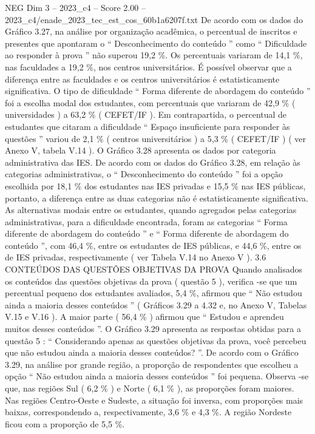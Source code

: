 \begin{textsample}{NEG Dim 3 – 2023\_c4 – Score 2.00 – 2023\_c4/enade\_2023\_tec\_est\_cos\_60b1a6207f.txt}
De acordo com os dados do Gráfico 3.27, na análise por organização acadêmica, o percentual de inscritos e presentes que apontaram o “ Desconhecimento do conteúdo ” como “ Dificuldade ao responder à prova ” não superou 19,2 \%.
Os percentuais variaram de 14,1 \%, nas faculdades a 19,2 \%, nos centros universitários.
É possível observar que a diferença entre as faculdades e os centros universitários é estatisticamente significativa.
O tipo de dificuldade “ Forma diferente de abordagem do conteúdo ” foi a escolha modal dos estudantes, com percentuais que variaram de 42,9 \% ( universidades ) a 63,2 \% ( CEFET/IF ).
Em contrapartida, o percentual de estudantes que citaram a dificuldade “ Espaço insuficiente para responder às questões ” variou de 2,1 \% ( centros universitários ) a 5,3 \% ( CEFET/IF ) ( ver Anexo V, tabela V.14 ).
O Gráfico 3.28 apresenta os dados por categoria administrativa das IES.
De acordo com os dados do Gráfico 3.28, em relação às categorias administrativas, o “ Desconhecimento do conteúdo ” foi a opção escolhida por 18,1 \% dos estudantes nas IES privadas e 15,5 \% nas IES públicas, portanto, a diferença entre as duas categorias não é estatisticamente significativa.
As alternativas modais entre os estudantes, quando agregados pelas categorias administrativas, para a dificuldade encontrada, foram as categorias “ Forma diferente de abordagem do conteúdo ” e “ Forma diferente de abordagem do conteúdo ”, com 46,4 \%, entre os estudantes de IES públicas, e 44,6 \%, entre os de IES privadas, respectivamente ( ver Tabela V.14 no Anexo V ). 3.6 CONTEÚDOS DAS QUESTÕES OBJETIVAS DA PROVA Quando analisados os conteúdos das questões objetivas da prova ( questão 5 ), verifica -se que um percentual pequeno dos estudantes avaliados, 5,4 \%, afirmou que “ Não estudou ainda a maioria desses conteúdos ” ( Gráficos 3.29 a 4.32 e, no Anexo V, Tabelas V.15 e V.16 ).
A maior parte ( 56,4 \% ) afirmou que “ Estudou e aprendeu muitos desses conteúdos ”.
O Gráfico 3.29 apresenta as respostas obtidas para a questão 5 : “ Considerando apenas as questões objetivas da prova, você percebeu que não estudou ainda a maioria desses conteúdos? ”.
De acordo com o Gráfico 3.29, na análise por grande região, a proporção de respondentes que escolheu a opção “ Não estudou ainda a maioria desses conteúdos ” foi pequena.
Observa -se que, nas regiões Sul ( 6,2 \% ) e Norte ( 6,1 \% ), as proporções foram maiores.
Nas regiões Centro-Oeste e Sudeste, a situação foi inversa, com proporções mais baixas, correspondendo a, respectivamente, 3,6 \% e 4,3 \%.
A região Nordeste ficou com a proporção de 5,5 \%.

\end{textsample}
